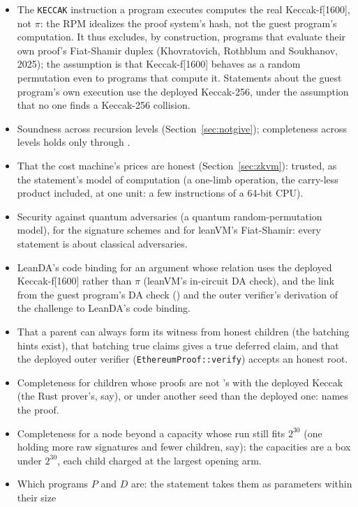 \documentclass[11pt]{article}
\begin{document}
\begin{itemize}
\item The \texttt{KECCAK} instruction a program executes computes the real Keccak-f[1600], not
$\pi$: the RPM idealizes the proof system's hash, not the guest program's computation. It thus
excludes, by construction, programs that evaluate their own proof's Fiat-Shamir duplex
(Khovratovich, Rothblum and Soukhanov, 2025); the assumption is that Keccak-f[1600] behaves as a
random permutation even to programs that compute it. Statements
about the guest program's own execution use the deployed Keccak-256, under the assumption that no
one finds a Keccak-256 collision.
\item Soundness across recursion levels (Section~\ref{sec:notgive}); completeness across levels
holds only through .
\item That the cost machine's prices are honest (Section~\ref{sec:zkvm}): trusted, as the
statement's model of computation (a one-limb operation, the carry-less product included, at one
unit: a few instructions of a 64-bit CPU).
\item Security against quantum adversaries (a quantum random-permutation model), for the
signature schemes and for leanVM's Fiat-Shamir: every statement is about classical adversaries.
\item LeanDA's code binding for an argument whose relation uses the deployed Keccak-f[1600] rather than $\pi$ (leanVM's in-circuit DA check), and the link from the guest
program's DA check () and the outer verifier's derivation of the challenge to
LeanDA's code binding.
\item That a parent can always form its witness from honest children (the batching hints exist),
that batching true claims gives a true deferred claim, and that the deployed outer verifier
(\texttt{EthereumProof::verify}) accepts an honest root.
\item Completeness for children whose proofs are not 's with the
deployed Keccak (the Rust prover's, say), or under another seed than the deployed one:
 names the proof.
\item Completeness for a node beyond a capacity whose run still fits $2^{30}$ (one holding more raw signatures and fewer children, say): the capacities are a box under $2^{30}$, each child charged at the largest opening arm.
\item Which programs $P$ and $D$ are: the statement takes them as parameters within their size

\end{itemize}
\end{document}
